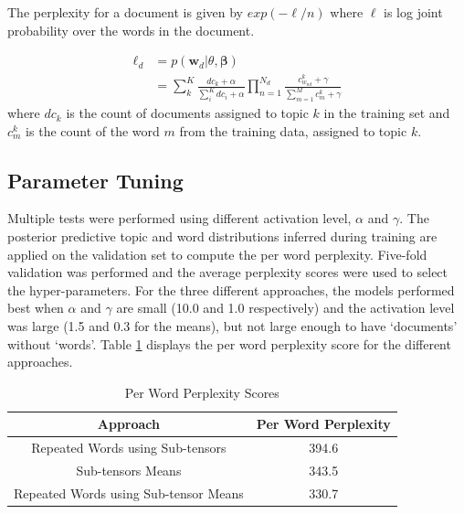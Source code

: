 \documentclass{article}
\begin{document}
The perplexity for a document is given by $exp(-\ell/n)$ where $\ell$ is log joint probability over the words in the document.

\vspace{-0.5cm}
\begin{equation}
\begin{split}
\ell_d &= p(\bm{w}_d | \theta, \bm{\beta}) \\
 & = \sum_k^K \frac{dc_k + \alpha}{\sum_i^K dc_i + \alpha}\prod_{n=1}^{N_d} \frac{c_{w_{nd}}^k + \gamma}{\sum_{m=1}^M c_m^k + \gamma}
\end{split}
\end{equation}
where $dc_k$ is the count of documents assigned to topic $k$ in the training set and $c_m^k$ is the count of the word $m$ from the training data, assigned to topic $k$. 

\subsection{Parameter Tuning} \label{params}
Multiple tests were performed using different activation level, $\alpha$ and $\gamma$. The posterior predictive topic and word distributions inferred during training are applied on the validation set to compute the per word perplexity. Five-fold validation was performed and the average perplexity scores were used to select the hyper-parameters. For the three different approaches, the models performed best when $\alpha$ and $\gamma$ are small (10.0 and 1.0 respectively) and the activation level was large (1.5 and 0.3 for the means), but not large enough to have `documents' without `words'. Table \ref{tab:perplexity} displays the per word perplexity score for the different approaches. 

\begin{table}[h]
\caption{Per Word Perplexity Scores}
\label{tab:perplexity}
\centering
\begin{tabular}{|c|c|}
\hline
Approach                              & \multicolumn{1}{l|}{Per Word Perplexity} \\ \hline
Repeated Words using Sub-tensors      & 394.6                                    \\
Sub-tensors Means                     & 343.5                                    \\
Repeated Words using Sub-tensor Means & 330.7                                    \\ \hline
\end{tabular}
\end{table}
\end{document}
